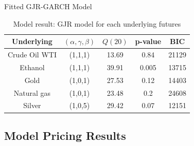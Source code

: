 \documentclass[8pt]{beamer}
\numberwithin{equation}{section}
\begin{document}
\begin{frame}{Fitted GJR-GARCH Model}
\begin{table}[!ht]
\centering
\begin{tabular}{ccccc}
\toprule
Underlying & $ (\alpha, \gamma, \beta) $ & $ Q(20) $ & p-value & BIC \\
\midrule
Crude Oil WTI & (1,1,1) & 13.69 & 0.84 & 21129 \\
Ethanol & (1,1,1) & 39.91 & 0.005 & 13715 \\
Gold & (1,0,1) & 27.53 & 0.12 & 14403  \\
Natural gas & (1,0,1) & 23.48 & 0.2 & 24608 \\
Silver & (1,0,5) & 29.42 & 0.07 & 12151 \\
\bottomrule
\end{tabular}
\caption{Model result: GJR model for each underlying futures}
\label{model result}
\end{table}
\end{frame}

\subsection{Model Pricing Results}
\end{document}
